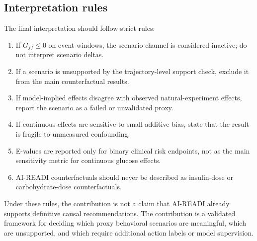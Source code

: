\subsection{Interpretation rules}
\label{subsec:cf_interpretation_rules}

The final interpretation should follow strict rules:
\begin{enumerate}
    \item If $G_{ff}\leq 0$ on event windows, the scenario channel is considered inactive; do not interpret scenario deltas.
    \item If a scenario is unsupported by the trajectory-level support check, exclude it from the main counterfactual results.
    \item If model-implied effects disagree with observed natural-experiment effects, report the scenario as a failed or unvalidated proxy.
    \item If continuous effects are sensitive to small additive bias, state that the result is fragile to unmeasured confounding.
    \item E-values are reported only for binary clinical risk endpoints, not as the main sensitivity metric for continuous glucose effects.
    \item AI-READI counterfactuals should never be described as insulin-dose or carbohydrate-dose counterfactuals.
\end{enumerate}

Under these rules, the contribution is not a claim that AI-READI already supports definitive causal recommendations. The contribution is a validated framework for deciding which proxy behavioral scenarios are meaningful, which are unsupported, and which require additional action labels or model supervision.

